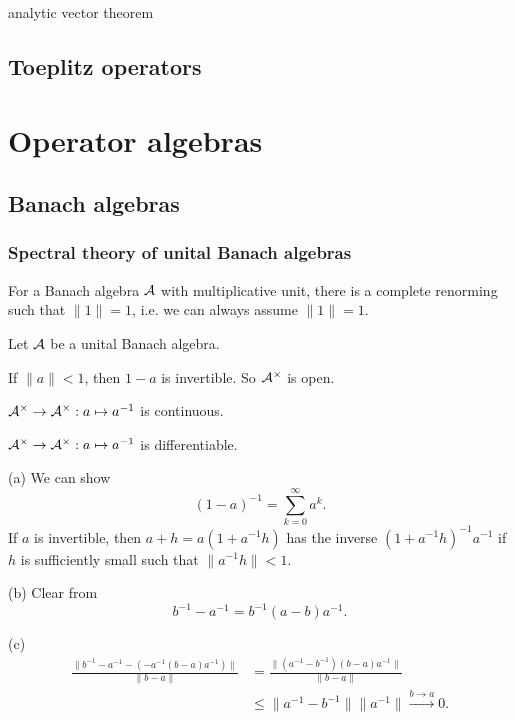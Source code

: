 \documentclass{../../large}
\begin{document}
analytic vector theorem


\chapter{Toeplitz operators}








\part{Operator algebras}
\chapter{Banach algebras}

\section{Spectral theory of unital Banach algebras}

\begin{prb}
For a Banach algebra $\mathcal{A}$ with multiplicative unit, there is a complete renorming such that $\|1\|=1$, i.e. we can always assume $\|1\|=1$.

Let $\mathcal{A}$ be a unital Banach algebra.
\begin{parts}
\item If $\|a\|<1$, then $1-a$ is invertible. So $\mathcal{A}^\times$ is open.
\item $\mathcal{A}^\times\to\mathcal{A}^\times:a\mapsto a^{-1}$ is continuous.
\item $\mathcal{A}^\times\to\mathcal{A}^\times:a\mapsto a^{-1}$ is differentiable.
\end{parts}
\end{prb}
\begin{pf}
(a)
We can show
\[(1-a)^{-1}=\sum_{k=0}^\infty a^k.\]
If $a$ is invertible, then $a+h=a(1+a^{-1}h)$ has the inverse $(1+a^{-1}h)^{-1}a^{-1}$ if $h$ is sufficiently small such that $\|a^{-1}h\|<1$.

(b)
Clear from
\[b^{-1}-a^{-1}=b^{-1}(a-b)a^{-1}.\]

(c)
\begin{align*}
\frac{\|b^{-1}-a^{-1}-(-a^{-1}(b-a)a^{-1})\|}{\|b-a\|}
&=\frac{\|(a^{-1}-b^{-1})(b-a)a^{-1}\|}{\|b-a\|}\\
&\le\|a^{-1}-b^{-1}\|\|a^{-1}\|\xrightarrow{b\to a}0.
\end{align*}
\end{pf}
\end{document}
